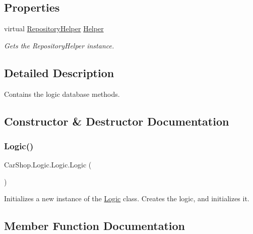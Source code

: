 \subsection*{Properties}
\begin{DoxyCompactItemize}
\item 
virtual \mbox{\hyperlink{class_car_shop_1_1_repository_1_1_repository_helper}{Repository\+Helper}} \mbox{\hyperlink{class_car_shop_1_1_logic_1_1_logic_afd4e310134ff008f7726801974519e46}{Helper}}
\begin{DoxyCompactList}\small\item\em Gets the Repository\+Helper instance. \end{DoxyCompactList}\end{DoxyCompactItemize}


\subsection{Detailed Description}
Contains the logic database methods. 



\subsection{Constructor \& Destructor Documentation}
\mbox{\label{class_car_shop_1_1_logic_1_1_logic_af006d6f092e7d6adabc05cb8e546d829}} 
\subsubsection{\texorpdfstring{Logic()}{Logic()}}
{\footnotesize\ttfamily Car\+Shop.\+Logic.\+Logic.\+Logic (\begin{DoxyParamCaption}{ }\end{DoxyParamCaption})}



Initializes a new instance of the \mbox{\hyperlink{class_car_shop_1_1_logic_1_1_logic}{Logic}} class. Creates the logic, and initializes it. 



\subsection{Member Function Documentation}
\mbox{\label{class_car_shop_1_1_logic_1_1_logic_a6f7a2a96646053b01067455ed0b8d0a5}} 
